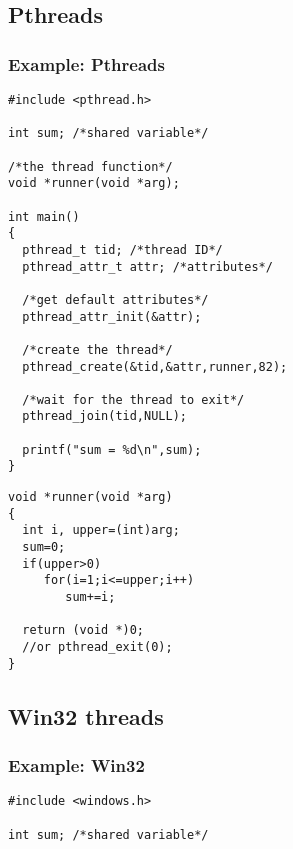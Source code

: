 \documentclass[CJKutf8,xcolor=pdftex,dvipsnames,table]{beamer}
\begin{document}
\begin{CJK*}{UTF8}{song}
  \subsection{Pthreads}

  \begin{frame}[fragile]
  \frametitle{Example: Pthreads} \pause
  \begin{minipage}[c]{0.6\textwidth}

\begin{lstlisting}
#include <pthread.h>

int sum; /*shared variable*/

/*the thread function*/
void *runner(void *arg);

int main()
{
  pthread_t tid; /*thread ID*/
  pthread_attr_t attr; /*attributes*/

  /*get default attributes*/
  pthread_attr_init(&attr);

  /*create the thread*/
  pthread_create(&tid,&attr,runner,82);

  /*wait for the thread to exit*/
  pthread_join(tid,NULL);

  printf("sum = %d\n",sum);
}
\end{lstlisting}

  \end{minipage}%
  \begin{minipage}[c]{0.4\textwidth}
\lstset{frame=single}
\begin{lstlisting}
void *runner(void *arg)
{
  int i, upper=(int)arg;
  sum=0;
  if(upper>0)
     for(i=1;i<=upper;i++)
        sum+=i;

  return (void *)0;
  //or pthread_exit(0);
}
\end{lstlisting}

  \end{minipage}
\end{frame}

  \subsection{Win32 threads}

  \begin{frame}[fragile]
  \frametitle{Example: Win32} \pause
  \begin{minipage}[c]{0.6\textwidth}

\begin{lstlisting}
#include <windows.h>

int sum; /*shared variable*/


\end{lstlisting}
\end{minipage}
\end{frame}
\end{CJK*}
\end{document}
